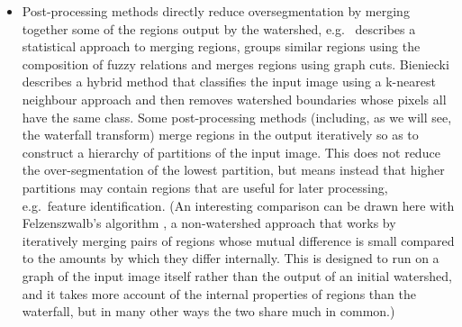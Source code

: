 \documentclass[preprint,a4paper]{elsarticle}
\begin{document}
\begin{itemize}
\item Post-processing methods \cite{bieniecki04,duarte05,frucci06,gies04,patino05,stawiaski08} directly reduce oversegmentation by merging together some of the regions output by the watershed, e.g.~\cite{gies04} describes a statistical approach to merging regions, \cite{patino05} groups similar regions using the composition of fuzzy relations and \cite{stawiaski08} merges regions using graph cuts. Bieniecki \cite{bieniecki04} describes a hybrid method that classifies the input image using a k-nearest neighbour approach and then removes watershed boundaries whose pixels all have the same class. Some post-processing methods (including, as we will see, the waterfall transform) merge regions in the output iteratively so as to construct a hierarchy of partitions of the input image. This does not reduce the over-segmentation of the lowest partition, but means instead that higher partitions may contain regions that are useful for later processing, e.g.~feature identification. (An interesting comparison can be drawn here with Felzenszwalb's algorithm \cite{felzenszwalb03}, a non-watershed approach that works by iteratively merging pairs of regions whose mutual difference is small compared to the amounts by which they differ internally. This is designed to run on a graph of the input image itself rather than the output of an initial watershed, and it takes more account of the internal properties of regions than the waterfall, but in many other ways the two share much in common.)

\end{itemize}
%
\end{document}
